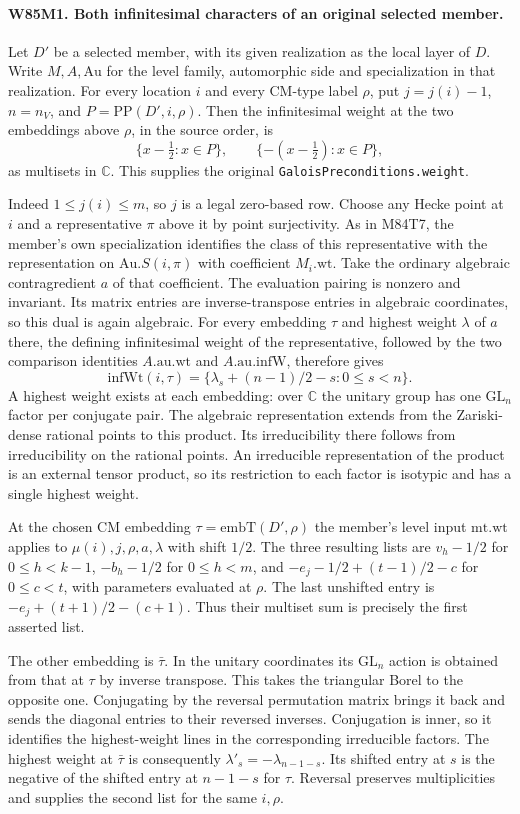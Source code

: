 \paragraph{W85M1. Both infinitesimal characters of an original selected member.}
Let $D'$ be a selected member, with its given realization as the local
layer of $D$. Write $M,A,\mathrm{Au}$ for the level family, automorphic
side and specialization in that realization. For every location $i$ and
every CM-type label $\rho$, put $j=j(i)-1$, $n=n_V$, and
$P=\mathrm{PP}(D',i,\rho)$. Then the infinitesimal weight at the two
embeddings above $\rho$, in the source order, is
\[
       \{x-\tfrac12:x\in P\},\qquad
       \{-(x-\tfrac12):x\in P\},
\]
as multisets in $\mathbb C$. This supplies the original
\texttt{GaloisPreconditions.weight}.

Indeed $1\le j(i)\le m$, so $j$ is a legal zero-based row.
Choose any Hecke point at $i$ and a representative $\pi$ above it by
point surjectivity. As in M84T7, the member's own specialization
identifies the class of this representative with the representation on
$\mathrm{Au}.S(i,\pi)$ with coefficient $M_i.\mathrm{wt}$. Take the
ordinary algebraic contragredient $a$ of that coefficient. The evaluation
pairing is nonzero and invariant. Its matrix entries are inverse-transpose
entries in algebraic coordinates, so this dual is again algebraic.
For every embedding $\tau$ and highest weight $\lambda$ of $a$ there,
the defining infinitesimal weight of the representative, followed by the
two comparison identities $A.\mathrm{au}.\mathrm{wt}$ and
$A.\mathrm{au}.\mathrm{infW}$, therefore gives
\[
 \mathrm{infWt}(i,\tau)=
 \{\lambda_s+(n-1)/2-s:0\le s<n\}.
\]
A highest weight exists at each embedding: over $\mathbb C$ the
unitary group has one $\mathrm{GL}_n$ factor per conjugate pair.
The algebraic representation extends from the Zariski-dense rational
points to this product. Its irreducibility there follows from
irreducibility on the rational points. An irreducible representation
of the product is an external tensor product, so its restriction to
each factor is isotypic and has a single highest weight.

At the chosen CM embedding $\tau=\mathrm{embT}(D',\rho)$ the member's
level input $\mathrm{mt}.\mathrm{wt}$ applies to $\mu(i),j,\rho,a,\lambda$
with shift $1/2$. The three resulting lists are $v_h-1/2$ for
$0\le h<k-1$, $-b_h-1/2$ for $0\le h<m$, and
$-e_j-1/2+(t-1)/2-c$ for $0\le c<t$, with parameters evaluated at
$\rho$. The last unshifted entry is $-e_j+(t+1)/2-(c+1)$.
Thus their multiset sum is precisely the first asserted list.

The other embedding is $\bar\tau$. In the unitary coordinates its
$\mathrm{GL}_n$ action is obtained from that at $\tau$ by inverse
transpose. This takes the triangular Borel to the opposite one.
Conjugating by the reversal permutation matrix brings it back and sends
the diagonal entries to their reversed inverses. Conjugation is inner,
so it identifies the highest-weight lines in the corresponding
irreducible factors. The highest weight at $\bar\tau$ is consequently
$\lambda'_s=-\lambda_{n-1-s}$. Its shifted entry at $s$ is the negative
of the shifted entry at $n-1-s$ for $\tau$. Reversal preserves
multiplicities and supplies the second list for the same $i,\rho$.

